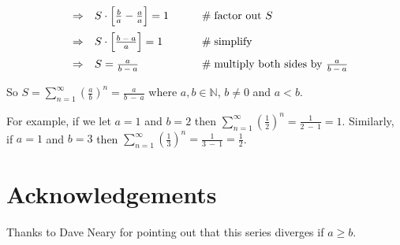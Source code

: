 \documentclass[11pt, oneside]{article}   	%
\begin{document}
\begin{equation*}
\begin{array}{lllll}
\vspace{2.0mm}
&\Rightarrow&  S \cdot \Big [\frac{b}{a}  - \frac{a}{a} \Big ] = 1                                                                                                 &\qquad  \mathrel{\#} \text{factor out $S$}                                          \\
\vspace{2.0mm}
&\Rightarrow& S \cdot \Big [ \frac{b \:-\: a} {a} \Big ]= 1                                                                                                           &\qquad  \mathrel{\#} \text{simplify}                                                      \\ 
&\Rightarrow& S  = \frac{a}{b \:-\: a}                                                                                                                                        &\qquad  \mathrel{\#} \text{multiply both sides by $ \frac{a}{b \:-\: a} $}
\end{array}
\end{equation*}

\bigskip
\noindent
So $S = \sum\limits_{n = 1}^\infty (\frac{a}{b})^n  =  \frac{a}{b \:-\: a}$ where $a,b \in \mathbb{N}$, $b \neq 0$ and $a < b$.  

\bigskip
\noindent
For example, if we  let $a =1$ and $b =2$ then $\sum\limits_{n = 1}^\infty (\frac{1}{2})^n  =  \frac{1}{2 \:-\: 1} = 1$. Similarly, if $a =1$ and $b = 3$ then 
$\sum\limits_{n = 1}^\infty (\frac{1}{3})^n  =  \frac{1}{3 \:-\: 1} = \frac{1}{2}$. 

\bigskip
\noindent
\section*{Acknowledgements}

Thanks to Dave Neary for pointing out that this series diverges if $a \geq b$.
\end{document}
